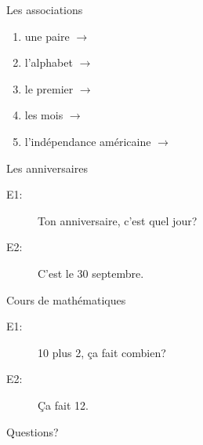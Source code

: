 \documentclass{beamer}
\begin{document}
  \begin{frame}{Les associations}
    \begin{enumerate}
      \item une paire $\to$ \underline{}
      \item l'alphabet $\to$ \underline{}
      \item le premier $\to$ \underline{}
      \item les mois $\to$ \underline{}
      \item l'indépendance américaine $\to$ \underline{}
    \end{enumerate}
  \end{frame}

  \begin{frame}{Les anniversaires}
    \begin{description}
      \item[E1:] Ton anniversaire, c'est quel jour?
      \item[E2:] C'est le 30 septembre.
    \end{description}
  \end{frame}

  \begin{frame}{Cours de mathématiques}
    \begin{description}
      \item[E1:] 10 plus 2, ça fait combien?
      \item[E2:] Ça fait 12.
    \end{description}
  \end{frame}

  \begin{frame}{}
    \begin{center}
      \Large Questions?
    \end{center}
  \end{frame}
\end{document}
